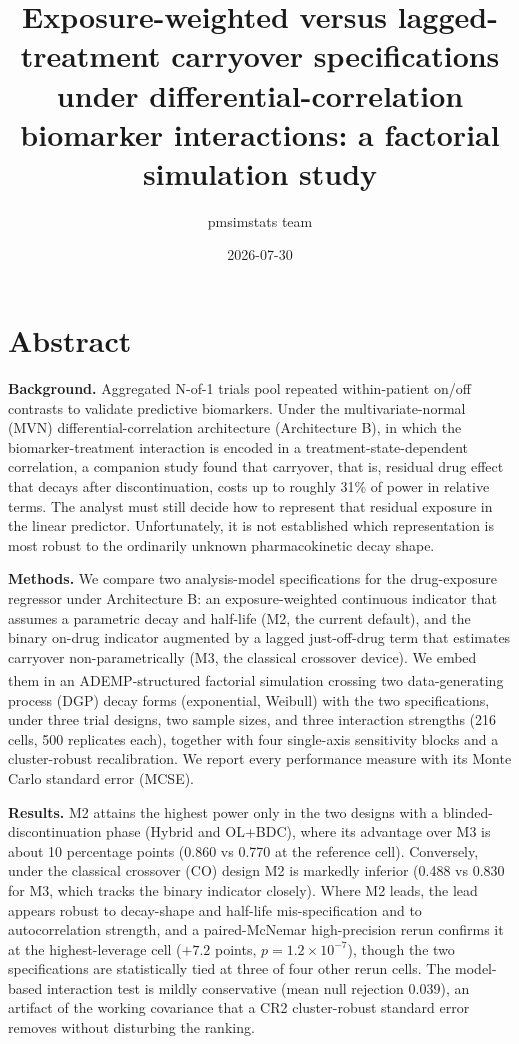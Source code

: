 \documentclass[
  11pt,
]{article}
\title{Exposure-weighted versus lagged-treatment carryover specifications under differential-correlation biomarker interactions: a factorial simulation study}
\author{pmsimstats team}
\date{2026-07-30}
\begin{document}
\maketitle

\section*{Abstract}\label{abstract}

\textbf{Background.} Aggregated N-of-1 trials pool repeated within-patient
on/off contrasts to validate predictive biomarkers. Under the
multivariate-normal (MVN) differential-correlation architecture
(Architecture B), in which the biomarker-treatment interaction is
encoded in a treatment-state-dependent correlation, a companion study
found that carryover, that is, residual drug effect that decays after
discontinuation, costs up to roughly 31\% of power in relative terms.
The analyst must still decide how to represent that residual exposure
in the linear predictor. Unfortunately, it is not established which
representation is most robust to the ordinarily unknown
pharmacokinetic decay shape.

\textbf{Methods.} We compare two analysis-model specifications for the
drug-exposure regressor under Architecture B: an exposure-weighted
continuous indicator that assumes a parametric decay and half-life
(M2, the current default), and the binary on-drug indicator augmented
by a lagged just-off-drug term that estimates carryover
non-parametrically (M3, the classical crossover device). We embed
them in an ADEMP-structured factorial simulation\textsuperscript{} crossing two data-generating process (DGP)
decay forms (exponential, Weibull) with the two specifications, under
three trial designs, two sample sizes, and three interaction
strengths (216 cells, 500 replicates each), together with four
single-axis sensitivity blocks and a cluster-robust recalibration. We
report every performance measure with its Monte Carlo standard error
(MCSE).

\textbf{Results.} M2 attains the highest power only in the two designs
with a blinded-discontinuation phase (Hybrid and OL+BDC), where its
advantage over M3 is about 10 percentage points (0.860 vs 0.770 at
the reference cell). Conversely, under the classical crossover (CO)
design M2 is markedly inferior (0.488 vs 0.830 for M3, which tracks
the binary indicator closely). Where M2 leads, the lead appears
robust to decay-shape and half-life mis-specification and to
autocorrelation strength, and a paired-McNemar high-precision rerun
confirms it at the highest-leverage cell (\(+7.2\) points,
\(p = 1.2 \times 10^{-7}\)),
though the two specifications are statistically tied at three of
four other rerun cells. The model-based interaction test is mildly
conservative (mean null rejection 0.039), an artifact of the working
covariance that a CR2 cluster-robust standard error removes without
disturbing the ranking.
\end{document}
